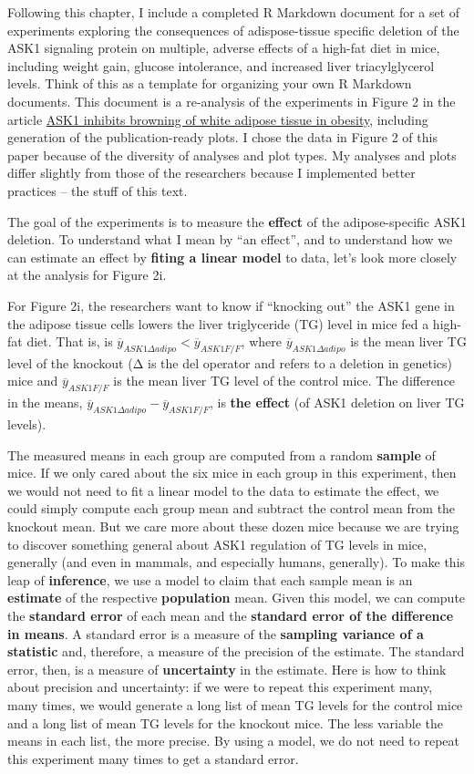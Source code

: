 \documentclass[]{book}
\begin{document}
Following this chapter, I include a completed R Markdown document for a set of experiments exploring the consequences of adispose-tissue specific deletion of the ASK1 signaling protein on multiple, adverse effects of a high-fat diet in mice, including weight gain, glucose intolerance, and increased liver triacylglycerol levels. Think of this as a template for organizing your own R Markdown documents. This document is a re-analysis of the experiments in Figure 2 in the article \href{https://www.nature.com/articles/s41467-020-15483-7}{ASK1 inhibits browning of white adipose tissue in obesity}, including generation of the publication-ready plots. I chose the data in Figure 2 of this paper because of the diversity of analyses and plot types. My analyses and plots differ slightly from those of the researchers because I implemented better practices -- the stuff of this text.

The goal of the experiments is to measure the \textbf{effect} of the adipose-specific ASK1 deletion. To understand what I mean by ``an effect'', and to understand how we can estimate an effect by \textbf{fiting a linear model} to data, let's look more closely at the analysis for Figure 2i.

For Figure 2i, the researchers want to know if ``knocking out'' the ASK1 gene in the adipose tissue cells lowers the liver triglyceride (TG) level in mice fed a high-fat diet. That is, is \(\overline{y}_{ASK1Δadipo} < \overline{y}_{ASK1F/F}\), where \(\overline{y}_{ASK1Δadipo}\) is the mean liver TG level of the knockout (Δ is the del operator and refers to a deletion in genetics) mice and \(\overline{y}_{ASK1F/F}\) is the mean liver TG level of the control mice. The difference in the means, \(\overline{y}_{ASK1Δadipo} - \overline{y}_{ASK1F/F}\), is \textbf{the effect} (of ASK1 deletion on liver TG levels).

The measured means in each group are computed from a random \textbf{sample} of mice. If we only cared about the six mice in each group in this experiment, then we would not need to fit a linear model to the data to estimate the effect, we could simply compute each group mean and subtract the control mean from the knockout mean. But we care more about these dozen mice because we are trying to discover something general about ASK1 regulation of TG levels in mice, generally (and even in mammals, and especially humans, generally). To make this leap of \textbf{inference}, we use a model to claim that each sample mean is an \textbf{estimate} of the respective \textbf{population} mean. Given this model, we can compute the \textbf{standard error} of each mean and the \textbf{standard error of the difference in means}. A standard error is a measure of the \textbf{sampling variance of a statistic} and, therefore, a measure of the precision of the estimate. The standard error, then, is a measure of \textbf{uncertainty} in the estimate. Here is how to think about precision and uncertainty: if we were to repeat this experiment many, many times, we would generate a long list of mean TG levels for the control mice and a long list of mean TG levels for the knockout mice. The less variable the means in each list, the more precise. By using a model, we do not need to repeat this experiment many times to get a standard error.
\end{document}
